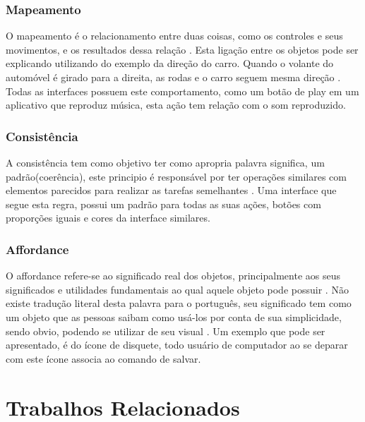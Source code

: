 \documentclass[12pt,oneside,a4paper,chapter=TITLE,section=TITLE,sumario=tradicional]{abntex2}
\begin{document}
\subsection{Mapeamento}
\label{sec:mapeamento}

O mapeamento é o relacionamento entre duas coisas, como os controles e seus movimentos, e os resultados dessa relação \cite{norman2002}. Esta ligação entre os objetos pode ser explicando utilizando do exemplo da direção do carro. Quando o volante do automóvel é girado para a direita, as rodas e o carro seguem mesma direção \cite{norman2002}. Todas as interfaces possuem este comportamento, como um botão de play em um aplicativo que reproduz música, esta ação tem relação com o som reproduzido.

\subsection{Consistência}
\label{sec:consciencia}

A consistência tem como objetivo ter como apropria palavra significa, um padrão(coerência), este principio é responsável por ter operações similares com elementos parecidos para realizar as tarefas semelhantes \cite{agni2015}. Uma interface que segue esta regra, possui um padrão para todas as suas ações, botões com proporções iguais e cores da interface similares.

\subsection{Affordance}
\label{sec:affordance}

O affordance refere-se ao significado real dos objetos, principalmente aos seus significados e utilidades fundamentais ao qual aquele objeto pode possuir \cite{norman2002}. Não existe tradução literal desta palavra para o português, seu significado tem como um objeto que as pessoas saibam como usá-los por conta de sua simplicidade, sendo obvio, podendo se utilizar de seu visual \cite{agni2015}. Um exemplo que pode ser apresentado, é do ícone de disquete, todo usuário de computador ao se deparar com este ícone associa ao comando de salvar.

\chapter{Trabalhos Relacionados}
\label{cap:trabalhos-relacionados}
\end{document}
